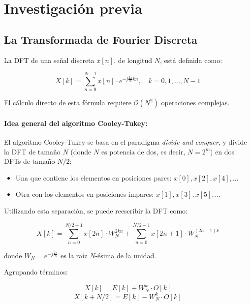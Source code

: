 \section{Investigación previa}

\subsection{La Transformada de Fourier Discreta}

La DFT de una señal discreta $x[n]$, de longitud $N$, está definida como:

\begin{equation}
    X[k] = \sum_{n=0}^{N-1} x[n] \cdot e^{-j \frac{2\pi}{N}kn}, \quad k = 0, 1, ..., N-1
\end{equation}

El cálculo directo de esta fórmula requiere $\mathcal{O}(N^2)$ operaciones complejas.

\paragraph{Idea general del algoritmo Cooley-Tukey:}

El algoritmo Cooley-Tukey se basa en el paradigma \textit{divide and conquer}, y divide la DFT de tamaño $N$ (donde $N$ es potencia de dos, es decir, $N=2^m$) en dos DFTs de tamaño $N/2$:

\begin{itemize}
    \item Una que contiene los elementos en posiciones pares: $x[0], x[2], x[4], \dots$
    \item Otra con los elementos en posiciones impares: $x[1], x[3], x[5], \dots$
\end{itemize}

Utilizando esta separación, se puede reescribir la DFT como:

\begin{equation}
    X[k] = \sum_{n=0}^{N/2 - 1} x[2n] \cdot W_N^{2kn} + \sum_{n=0}^{N/2 - 1} x[2n+1] \cdot W_N^{(2n+1)k}
\end{equation}

donde $W_N = e^{-j\frac{2\pi}{N}}$ es la raíz $N$-ésima de la unidad.

Agrupando términos:

\begin{equation}
    X[k] = E[k] + W_N^k \cdot O[k]
\end{equation}
\begin{equation}
    X[k + N/2] = E[k] - W_N^k \cdot O[k]
\end{equation}

